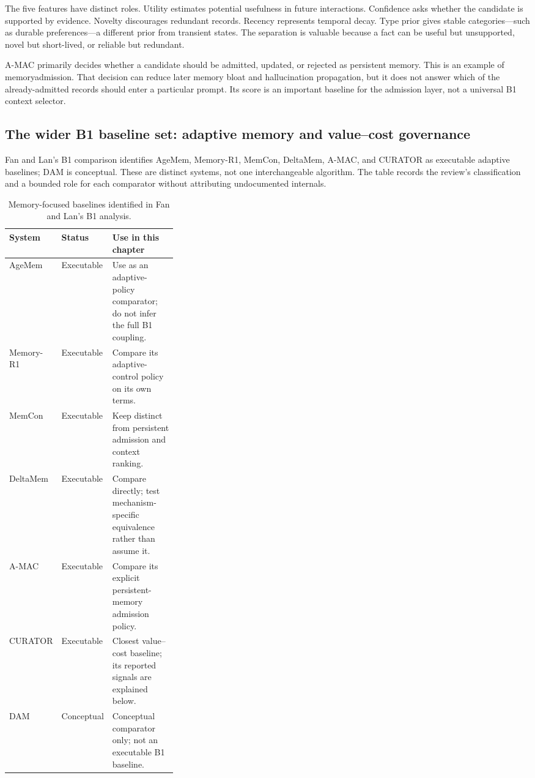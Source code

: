 The five features have distinct roles. Utility estimates potential usefulness in future interactions. Confidence asks whether the candidate is supported by evidence. Novelty discourages redundant records. Recency represents temporal decay. Type prior gives stable categories—such as durable preferences—a different prior from transient states. The separation is valuable because a fact can be useful but unsupported, novel but short-lived, or reliable but redundant.

A-MAC primarily decides whether a candidate should be admitted, updated, or rejected as persistent memory. This is an example of \gls{memoryadmission}. That decision can reduce later memory bloat and hallucination propagation, but it does not answer which of the already-admitted records should enter a particular prompt. Its score is an important baseline for the admission layer, not a universal B1 context selector.

\subsection{The wider B1 baseline set: adaptive memory and value--cost governance}
\label{subsec:ch12-b1-baselines}

Fan and Lan's B1 comparison identifies AgeMem, Memory-R1, MemCon, DeltaMem, A-MAC, and CURATOR as executable adaptive baselines; DAM is conceptual. These are distinct systems, not one interchangeable algorithm. The table records the review's classification and a bounded role for each comparator without attributing undocumented internals.

\begin{table}[H]
\centering
\footnotesize
\caption{Memory-focused baselines identified in Fan and Lan's B1 analysis.}
\label{tab:ch12-b1-baselines}
\begin{tabularx}{\linewidth}{@{}p{0.18\linewidth}p{0.14\linewidth}X@{}}
\toprule
\textbf{System} & \textbf{Status} & \textbf{Use in this chapter} \\
\midrule
AgeMem\index{AgeMem} & Executable & Use as an adaptive-policy comparator; do not infer the full B1 coupling. \\
Memory-R1\index{Memory-R1} & Executable & Compare its adaptive-control policy on its own terms. \\
MemCon\index{MemCon} & Executable & Keep distinct from persistent admission and context ranking. \\
DeltaMem\index{DeltaMem} & Executable & Compare directly; test mechanism-specific equivalence rather than assume it. \\
A-MAC & Executable & Compare its explicit persistent-memory admission policy. \\
CURATOR\index{CURATOR} & Executable & Closest value--cost baseline; its reported signals are explained below. \\
DAM\index{DAM} & Conceptual & Conceptual comparator only; not an executable B1 baseline. \\
\bottomrule
\end{tabularx}
\end{table}

